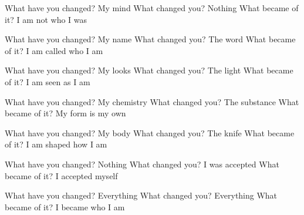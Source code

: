 What have you changed? My mind What changed you? Nothing What became of it? I am not who I was

What have you changed? My name What changed you? The word What became of it? I am called who I am

What have you changed? My looks What changed you? The light What became of it? I am seen as I am

What have you changed? My chemistry What changed you? The substance What became of it? My form is my own

What have you changed? My body What changed you? The knife What became of it? I am shaped how I am

What have you changed? Nothing What changed you? I was accepted What became of it? I accepted myself

What have you changed? Everything What changed you? Everything What became of it? I became who I am
